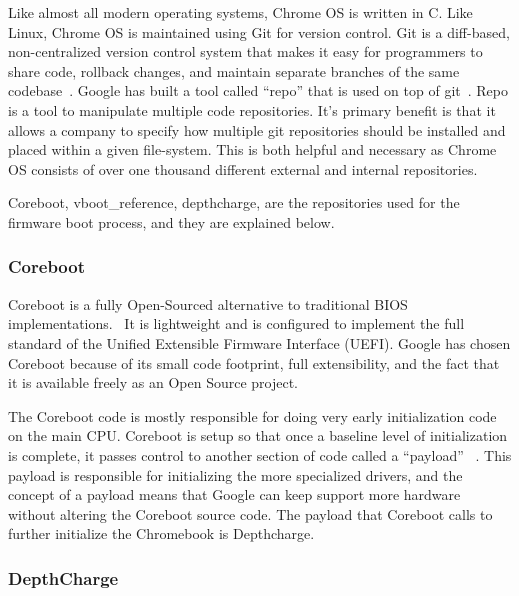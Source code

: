 \documentclass[../report.tex]{subfiles}
\begin{document}
Like almost all modern operating systems, Chrome OS is written in C.
Like Linux, Chrome OS is maintained using Git for version control. 
Git is a diff-based, non-centralized version control system that makes it easy for programmers to share code, rollback changes, and maintain separate branches of the same codebase~\cite{git}.
Google has built a tool called ``repo'' that is used on top of git~\cite{repo}. 
Repo is a tool to manipulate multiple code repositories. 
It's primary benefit is that it allows a company to specify how multiple git repositories should be installed and placed within a given file-system.
This is both helpful and necessary as Chrome OS consists of over one thousand different external and internal repositories. 

Coreboot, vboot\_reference, depthcharge, are the repositories used for the firmware boot process, and they are explained below. 

\subsubsection{Coreboot}

Coreboot is a fully Open-Sourced alternative to traditional BIOS implementations.~\cite{coreboot}
It is lightweight and is configured to implement the full standard of the Unified Extensible Firmware Interface (UEFI).
Google has chosen Coreboot because of its small code footprint, full extensibility, and the fact that it is available freely as an Open Source project.

The Coreboot code is mostly responsible for doing very early initialization code on the main CPU\@. 
Coreboot is setup so that once a baseline level of initialization is complete, it passes control to another section of code called a ``payload'' ~\cite{coreboot-payload}.
This payload is responsible for initializing the more specialized drivers, and the concept of a payload means that Google can keep support more hardware without altering the Coreboot source code.
The payload that Coreboot calls to further initialize the Chromebook is Depthcharge.


\subsubsection{DepthCharge}
\end{document}
